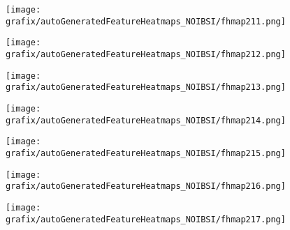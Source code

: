 \hspace{\hsp} 
\begin{subfigure}{\wid\textwidth} 
    \centering 
    \caption{\tiny \sffamily {}} 
    \vspace{\vsp} 
    \texttt{[image: grafix/autoGeneratedFeatureHeatmaps\_NOIBSI/fhmap211.png]} 
\end{subfigure} 
\hspace{\hsp} 
\begin{subfigure}{\wid\textwidth} 
    \centering 
    \caption{\tiny \sffamily {}} 
    \vspace{\vsp} 
    \texttt{[image: grafix/autoGeneratedFeatureHeatmaps\_NOIBSI/fhmap212.png]} 
\end{subfigure} 
\hspace{\hsp} 
\begin{subfigure}{\wid\textwidth} 
    \centering 
    \caption{\tiny \sffamily {}} 
    \vspace{\vsp} 
    \texttt{[image: grafix/autoGeneratedFeatureHeatmaps\_NOIBSI/fhmap213.png]} 
\end{subfigure} 
\hspace{\hsp} 
\begin{subfigure}{\wid\textwidth} 
    \centering 
    \caption{\tiny \sffamily {}} 
    \vspace{\vsp} 
    \texttt{[image: grafix/autoGeneratedFeatureHeatmaps\_NOIBSI/fhmap214.png]} 
\end{subfigure} 
\hspace{\hsp} 
\begin{subfigure}{\wid\textwidth} 
    \centering 
    \caption{\tiny \sffamily {}} 
    \vspace{\vsp} 
    \texttt{[image: grafix/autoGeneratedFeatureHeatmaps\_NOIBSI/fhmap215.png]} 
\end{subfigure} 
\hspace{\hsp} 
\begin{subfigure}{\wid\textwidth} 
    \centering 
    \caption{\tiny \sffamily {}} 
    \vspace{\vsp} 
    \texttt{[image: grafix/autoGeneratedFeatureHeatmaps\_NOIBSI/fhmap216.png]} 
\end{subfigure} 
\hspace{\hsp} 
\begin{subfigure}{\wid\textwidth} 
    \centering 
    \caption{\tiny \sffamily {}} 
    \vspace{\vsp} 
    \texttt{[image: grafix/autoGeneratedFeatureHeatmaps\_NOIBSI/fhmap217.png]} 
\end{subfigure} 
